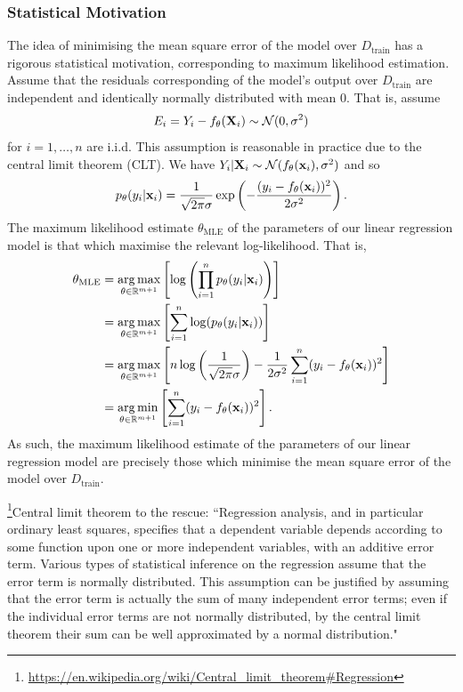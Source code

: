 \documentclass[11pt]{article}
\begin{document}
\subsubsection{Statistical Motivation}

The idea of minimising the mean square error of the model over $D_{\text{train}}$ has a rigorous statistical motivation, corresponding to maximum likelihood estimation. Assume that the residuals corresponding of the model's output over $D_{\text{train}}$ are independent and identically normally distributed with mean $0$. That is, assume
$$
E_i
=
Y_i-f_{\theta}(\mathbf{X}_i)\sim\mathcal{N}(0, \sigma^2)
$$
for $i=1,\dots,n$ are i.i.d. This assumption is reasonable in practice due to the central limit theorem (CLT). We have $Y_i|\mathbf{X}_i\sim\mathcal{N}(f_{\theta}(\mathbf{x}_i), \sigma^2)$ and so
$$
p_{\theta}(y_i|\mathbf{x}_i)=\frac{1}{\sqrt{2\pi}\sigma}\exp\left(-\frac{(y_i-f_{\theta}(\mathbf{x}_i))^2}{2\sigma^2}\right).
$$
The maximum likelihood estimate $\theta_{\text{MLE}}$ of the parameters of our linear regression model is that which maximise the relevant log-likelihood. That is,
\begin{align*}
    \theta_{\text{MLE}}
    &=
    \operatorname*{arg\,max}_{\theta\in\mathbb{R}^{m+1}}\left[\log\left(\prod_{i=1}^n p_{\theta}(y_i|\mathbf{x}_i)\right)\right]\\
    &=
    \operatorname*{arg\,max}_{\theta\in\mathbb{R}^{m+1}}\left[\sum_{i=1}^n\log(p_{\theta}(y_i|\mathbf{x}_i))\right]\\
    &=
    \operatorname*{arg\,max}_{\theta\in\mathbb{R}^{m+1}}\left[n\log\left(\frac{1}{\sqrt{2\pi}\sigma}\right)-\frac{1}{2\sigma^2}\sum_{i=1}^n(y_i-f_{\theta}(\mathbf{x}_i))^2\right]\\
    &=
    \operatorname*{arg\,min}_{\theta\in\mathbb{R}^{m+1}}\left[\sum_{i=1}^n(y_i-f_{\theta}(\mathbf{x}_i))^2\right].
\end{align*}
As such, the maximum likelihood estimate of the parameters of our linear regression model are precisely those which minimise the mean square error of the model over $D_{\text{train}}$.

\begin{tcolorbox}[title={\centering\textbf{Are residuals really normally distributed?}}, colback=myLightBlue, colbacktitle=myDarkBlue, colframe=myDarkBlue, coltitle=white]
    \footnote{\url{https://en.wikipedia.org/wiki/Central\_limit\_theorem\#Regression}}Central limit theorem to the rescue: ``Regression analysis, and in particular ordinary least squares, specifies that a dependent variable depends according to some function upon one or more independent variables, with an additive error term. Various types of statistical inference on the regression assume that the error term is normally distributed. This assumption can be justified by assuming that the error term is actually the sum of many independent error terms; even if the individual error terms are not normally distributed, by the central limit theorem their sum can be well approximated by a normal distribution."
\end{tcolorbox}
\end{document}
